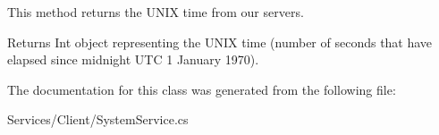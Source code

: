 This method returns the U\+N\+I\+X time from our servers. 

\begin{DoxyReturn}{Returns}
Int object representing the U\+N\+I\+X time (number of seconds that have elapsed since midnight U\+T\+C 1 January 1970).
\end{DoxyReturn}


The documentation for this class was generated from the following file\+:\begin{DoxyCompactItemize}
\item 
Services/\+Client/System\+Service.\+cs\end{DoxyCompactItemize}
